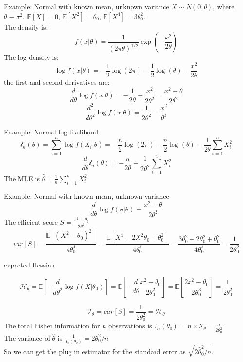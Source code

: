 \documentclass[aspectratio=169, handout, t]{beamer}
\numberwithin{equation}{section}
\begin{document}
\begin{frame}{Example: Normal with known mean, unknown variance}
$X\sim N(0, \theta)$, where $\theta\equiv \sigma^2$. $\mathbb{E}[X]=0$, $\mathbb{E}[X^2]=\theta_0$, $\mathbb{E}[X^4]=3\theta_0^2$.\\
The density is:
 $$f(x|\theta)=\frac{1}{(2\pi\theta)^{1/2}}\exp(-\frac{x^2}{2\theta})$$
The log density is:
$$\log f(x|\theta)=-\frac{1}{2}\log(2\pi)-\frac{1}{2}\log(\theta)-\frac{x^2}{2\theta}$$
the first and second derivatives are:
$$\frac{d}{d\theta}\log f(x|\theta)=-\frac{1}{2\theta}+\frac{x^2}{2\theta^2}=\frac{x^2-\theta}{2\theta^2}$$
$$\frac{d^2}{d\theta^2}\log f(x|\theta)=\frac{1}{2\theta^2}-\frac{x^2}{\theta^3}$$

\end{frame}


\begin{frame}{Example: Normal log likelihood}
$$\mathcal{l}_n(\theta)=\sum_{i=1}^n \log f(X_i|\theta)=-\frac{n}{2}\log(2\pi)-\frac{n}{2}\log(\theta)-\frac{1}{2\theta}\sum_{i=1}^n X_i^2$$
$$\frac{d}{d\theta}\mathcal{l}_n(\theta)=-\frac{n}{2\theta}+\frac{1}{2\theta^2}\sum_{i=1}^n X_i^2$$
The MLE is $\hat{\theta}=\frac{1}{n}\sum_{i=1}^n X_i^2$
\end{frame}


\begin{frame}{Example: Normal with known mean, unknown variance}
$$\frac{d}{d\theta}\log f(x|\theta)=\frac{x^2-\theta}{2\theta^2}$$
The efficient score $S=\frac{x^2-\theta_0}{2\theta_0^2}$
$$var[S]=\frac{\mathbb{E}[(X^2-\theta_0)^2]}{4\theta_0^4}=\frac{\mathbb{E}[X^4-2X^2\theta_0+\theta_0^2]}{4\theta_0^4}=\frac{3\theta_0^2-2\theta_0^2+\theta^2_0}{4\theta_0^4}=\frac{1}{2\theta_0^2}$$
\end{frame}





\begin{frame}{expected Hessian}

$$\mathcal{H}_\theta=\mathbb{E}[-\frac{d}{d\theta^2} \log f(X|\theta_0)]=\mathbb{E}[-\frac{d}{d\theta}\frac{x^2-\theta_0}{2\theta_0^2}]=\mathbb{E}[\frac{2x^2-\theta_0}{2\theta_0^3}]=\frac{1}{2\theta_0^2}$$

$$\mathcal{I}_\theta=var[S]=\frac{1}{2\theta_0^2}=\mathcal{H}_\theta$$
The total Fisher information for $n$ observations is $I_n(\theta_0)=n\times \mathcal{I}_\theta=\frac{n}{2\theta^2_0}$\\
The variance of $\hat{\theta}$ is $\frac{1}{I_n(\theta_0)}=2\theta^2_0/n$\\
So we can get the plug in estimator for the standard error as $\sqrt{2\hat{\theta}^2_0/n}$.
\end{frame}
\end{document}
